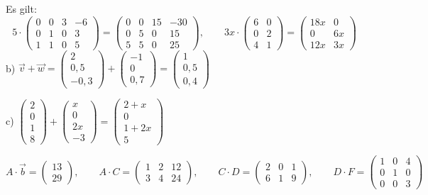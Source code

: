 Es gilt:
\[ 5 \cdot \begin{pmatrix} 0 & 0 & 3 & -6 \\ 0 & 1 & 0 & 3 \\ 1 & 1 & 0 & 5 \end{pmatrix} = \begin{pmatrix} 0 & 0 & 15 & -30 \\ 0 & 5 & 0 & 15 \\ 5 & 5 & 0 & 25 \end{pmatrix}, \qquad 3x \cdot \begin{pmatrix} 6 & 0 \\ 0 & 2 \\ 4 & 1 \end{pmatrix} = \begin{pmatrix} 18x & 0 \\ 0 & 6x \\ 12x & 3x \end{pmatrix} \]
b) $\vec{v} + \vec{w} = \begin{pmatrix} 2 \\ 0{,}5 \\ -0{,}3 \end{pmatrix} + \begin{pmatrix} -1 \\ 0 \\ 0{,}7 \end{pmatrix} = \begin{pmatrix} 1 \\ 0{,}5 \\ 0{,}4 \end{pmatrix}$

c) $\begin{pmatrix} 2 \\ 0 \\ 1 \\ 8 \end{pmatrix} + \begin{pmatrix} x \\ 0 \\ 2x \\ -3 \end{pmatrix} = \begin{pmatrix} 2 + x \\ 0 \\ 1 + 2x \\ 5 \end{pmatrix}$

\[ A \cdot \vec{b} = \begin{pmatrix} 13 \\ 29 \end{pmatrix}, \qquad A \cdot C = \begin{pmatrix} 1 & 2 & 12 \\ 3 & 4 & 24 \end{pmatrix}, \qquad C \cdot D = \begin{pmatrix} 2 & 0 & 1 \\ 6 & 1 & 9 \end{pmatrix}, \qquad D \cdot F = \begin{pmatrix} 1 & 0 & 4 \\ 0 & 1 & 0 \\ 0 & 0 & 3 \end{pmatrix} \]

